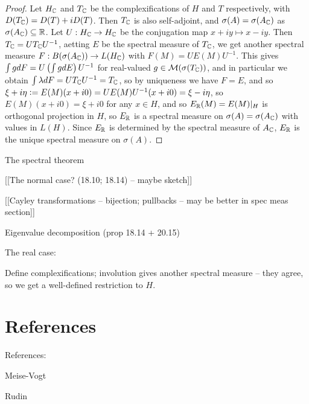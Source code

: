 \documentclass[10pt]{amsart}
\begin{document}
\begin{proof}
    Let $H_{\mathbb{C}}$ and $T_{\mathbb{C}}$ be the complexifications of $H$ and $T$ respectively, with $D(T_{\mathbb{C}}) = D(T) + iD(T)$. Then $T_{\mathbb{C}}$ is also self-adjoint, and $\sigma(A) = \sigma(A_{\mathbb{C}})$ as $\sigma(A_{\mathbb{C}}) \subseteq \mathbb{R}$. Let $U : H_{\mathbb{C}} \to H_{\mathbb{C}}$ be the conjugation map $x + iy \mapsto x - iy$. Then $T_{\mathbb{C}} = UT_{\mathbb{C}} U^{-1}$, aetting $E$ be the spectral measure of $T_{\mathbb{C}}$, we get another spectral measure $F : B(\sigma(A_{\mathbb{C}})) \to L(H_{\mathbb{C}})$ with $F(M) = UE(M)U^{-1}$. This gives $\int g dF = U\left(  \int g dE  \right)U^{-1}$ for real-valued $g \in \mathcal{M}(\sigma(T_{\mathbb{C}}))$, and in particular we obtain $\int \lambda dF = UT_{\mathbb{C}} U^{-1} = T_{\mathbb{C}}$, so by uniqueness we have $F = E$, and so $\xi + i \eta \vcentcolon= E(M)(x + i0) = UE(M)U^{-1}(x + i0) = \xi - i \eta$, so $E(M)(x + i0) = \xi + i0$ for any $x \in H$, and so $E_{\mathbb{R}}(M) = E(M)|_H$ is orthogonal projection in $H$, so $E_{\mathbb{R}}$ is a spectral measure on $\sigma(A) = \sigma(A_{\mathbb{C}})$ with values in $L(H)$. Since $E_{\mathbb{R}}$ is determined by the spectral measure of $A_{\mathbb{C}}$, $E_{\mathbb{R}}$ is the unique spectral measure on $\sigma(A)$.
\end{proof} %

The spectral theorem

[[The normal case? (18.10; 18.14) -- maybe sketch]]

[[Cayley transformations -- bijection; pullbacks -- may be better in spec meas section]]



Eigenvalue decomposition (prop 18.14 + 20.15)

The real case:

Define complexifications; involution gives another spectral measure -- they agree, so we get a well-defined restriction to $H$.

\section{References}
References:

Meise-Vogt

Rudin
\end{document}
